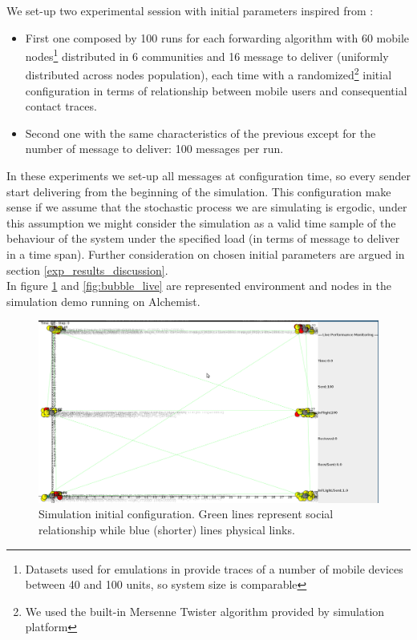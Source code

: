 We set-up two experimental session with initial parameters inspired from \cite[6.2]{bubble}:
\begin{itemize}
\item First one composed by 100 runs for each forwarding algorithm with 60 mobile nodes\footnote{Datasets used for emulations in\cite{bubble} provide traces of a number of mobile devices between 40 and 100 units, so system size is comparable} distributed in 6 communities and 16 message to deliver (uniformly distributed across nodes population), each time with a randomized\footnote{We used the built-in Mersenne Twister algorithm provided by simulation platform} initial configuration in terms of relationship between mobile users and consequential contact traces.
\item Second one with the same characteristics of the previous except for the number of message to deliver: 100 messages per run. 
\end{itemize}
In these experiments we set-up all messages at configuration time, so every sender start delivering from the beginning of the simulation. This configuration make sense if we assume that the stochastic process we are simulating is ergodic, under this assumption we might consider the simulation as a valid time sample of the behaviour of the system under the specified load (in terms of message to deliver in a time span). Further consideration on chosen initial parameters are argued in section \ref{exp_results_discussion}.\\
In figure \ref{fig:bubble_live_init} and \ref{fig:bubble_live} are represented environment and nodes in the simulation demo running on Alchemist.
\begin{figure}[h!]
	\begin{center}
    \includegraphics[scale=0.25]{img/bubble_live_init.png}
    \caption{Simulation initial configuration. Green lines represent social relationship while blue (shorter) lines physical links.}
    \label{fig:bubble_live_init}
  \end{center}
\end{figure}
